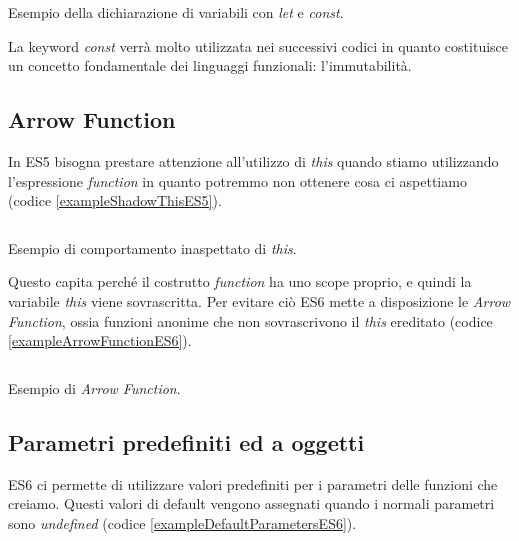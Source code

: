 \begin{listing}[ht]
\inputminted{Javascript}{sources/exampleLetConstES6.js}
\caption{Esempio della dichiarazione di variabili con \textit{let} e \textit{const}.}
\label{exampleLetConstES6}
\end{listing}

\noindent
La keyword \textit{const} verrà molto utilizzata nei successivi codici in quanto costituisce un concetto fondamentale dei linguaggi funzionali: l'immutabilità\footnotemark.

\subsection{Arrow Function}
In ES5 bisogna prestare attenzione all'utilizzo di \textit{this} quando stiamo utilizzando l'espressione \textit{function} in quanto potremmo non ottenere cosa ci aspettiamo (codice \ref{exampleShadowThisES5}).

\begin{listing}[ht]
\inputminted{Javascript}{sources/exampleShadowThisES5.js}
\caption{Esempio di comportamento inaspettato di \textit{this}.}
\label{exampleShadowThisES5}
\end{listing}

\noindent
Questo capita perché il costrutto \textit{function} ha uno scope proprio, e quindi la variabile \textit{this} viene sovrascritta. Per evitare ciò ES6 mette a disposizione le \textit{Arrow Function}, ossia funzioni anonime che non sovrascrivono il \textit{this} ereditato (codice \ref{exampleArrowFunctionES6}).

\begin{listing}[ht]
\inputminted{Javascript}{sources/exampleArrowFunctionES6.js}
\caption{Esempio di \textit{Arrow Function}.}
\label{exampleArrowFunctionES6}
\end{listing} 


\subsection{Parametri predefiniti ed a oggetti}
ES6 ci permette di utilizzare valori predefiniti per i parametri delle funzioni che creiamo. Questi valori di default vengono assegnati quando i normali parametri sono \textit{undefined} (codice \ref{exampleDefaultParametersES6}). 

